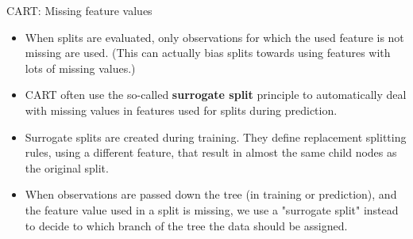 \documentclass[11pt,compress,t,notes=noshow, xcolor=table]{beamer}
\begin{document}
\begin{vbframe}{CART: Missing feature values}
  \begin{itemize}
    \item When splits are evaluated, only observations for which the used feature is not missing are used. (This can actually bias splits towards using features with lots of missing values.) 
  \item CART often use the so-called \textbf{surrogate split} principle to automatically deal with missing values in features used for splits during prediction.
  \item Surrogate splits are created during training. They define replacement splitting rules, using a different feature, that result in almost the same child nodes as the original split.
   \item When observations are passed down the tree (in training or prediction), and the feature value used in a split is missing, we use a "surrogate split" instead to decide to which branch of the tree the data should be assigned. 
  \end{itemize}
\end{vbframe}

\endlecture
\end{document}
